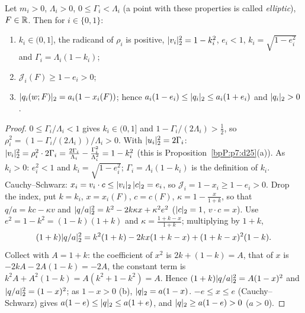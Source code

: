 \begin{lemma}\label{bpP:p14:sb-chart}
Let $m_i>0$, $\Lambda_i>0$, $0\le\Gamma_i<\Lambda_i$ (a point with these properties is called \emph{elliptic}), $F\in\mathbb{R}$. Then for $i\in\{0,1\}$:
\begin{enumerate}[label=(\alph*)]
\item $k_i\in(0,1]$, the radicand of $\rho_i$ is positive, $\lvert v_i\rvert_2^2=1-k_i^2$, $e_i<1$, $k_i=\sqrt{1-e_i^2}$ and $\Gamma_i=\Lambda_i(1-k_i)$;
\item $\mathcal J_i(F)\ge1-e_i>0$;
\item $\lvert q_i(w;F)\rvert_2=a_i(1-x_i(F))$; hence $a_i(1-e_i)\le\lvert q_i\rvert_2\le a_i(1+e_i)$ and $\lvert q_i\rvert_2>0$.
\end{enumerate}
\end{lemma}
\begin{proof}
\label{stepP:p14:sb-ch-a} $0\le\Gamma_i/\Lambda_i<1$ gives $k_i\in(0,1]$ and $1-\Gamma_i/(2\Lambda_i)>\frac12$, so $\rho_i^2=(1-\Gamma_i/(2\Lambda_i))/\Lambda_i>0$. With $\lvert u_i\rvert_2^2=2\Gamma_i$:
$\lvert v_i\rvert_2^2=\rho_i^2\cdot2\Gamma_i=\frac{2\Gamma_i}{\Lambda_i}-\frac{\Gamma_i^2}{\Lambda_i^2}=1-k_i^2$ (this is Proposition~\ref{bpP:p7:d25}(a)). As $k_i>0$: $e_i^2<1$ and $k_i=\sqrt{1-e_i^2}$; $\Gamma_i=\Lambda_i(1-k_i)$ is the definition of $k_i$.
\label{stepP:p14:sb-ch-b} Cauchy--Schwarz: $x_i=v_i\cdot c\le\lvert v_i\rvert_2\,\lvert c\rvert_2=e_i$, so $\mathcal J_i=1-x_i\ge1-e_i>0$.
\label{stepP:p14:sb-ch-c} Drop the index, put $k=k_i$, $x=x_i(F)$, $c=c(F)$, $\kappa=1-\frac x{1+k}$, so that $q/a=kc-\kappa v$ and
$\lvert q/a\rvert_2^2=k^2-2k\kappa x+\kappa^2e^2$ ($\lvert c\rvert_2=1$, $v\cdot c=x$). Use $e^2=1-k^2=(1-k)(1+k)$ and $\kappa=\frac{1+k-x}{1+k}$; multiplying by $1+k$,
\[(1+k)\lvert q/a\rvert_2^2=k^2(1+k)-2kx(1+k-x)+(1+k-x)^2(1-k).\]
Collect with $A=1+k$: the coefficient of $x^2$ is $2k+(1-k)=A$, that of $x$ is $-2kA-2A(1-k)=-2A$, the constant term is $k^2A+A^2(1-k)=A(k^2+1-k^2)=A$. Hence $(1+k)\lvert q/a\rvert_2^2=A(1-x)^2$ and $\lvert q/a\rvert_2^2=(1-x)^2$; as $1-x>0$ (b), $\lvert q\rvert_2=a(1-x)$.
\label{stepP:p14:sb-ch-d} $-e\le x\le e$ (Cauchy--Schwarz) gives $a(1-e)\le\lvert q\rvert_2\le a(1+e)$, and $\lvert q\rvert_2\ge a(1-e)>0$ ($a>0$).
\end{proof}

